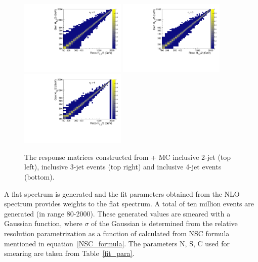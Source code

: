 \begin{figure}[!htbp]
\begin{center}
    \includegraphics[width=0.45\textwidth]{Plots_HT_2_150/Normalized_Response_Matrix_Madgraph_2_HT_2_150.pdf}%
    \includegraphics[width=0.45\textwidth]{Plots_HT_2_150/Normalized_Response_Matrix_Madgraph_3_HT_2_150.pdf}\\
    \includegraphics[width=0.45\textwidth]{Plots_HT_2_150/Normalized_Response_Matrix_Madgraph_4_HT_2_150.pdf} 
    \caption{The response matrices constructed from \MadGraphF + \PYTHIAS MC inclusive 2-jet (top left), inclusive 3-jet events (top right) and inclusive 4-jet events (bottom).}
    \label{fig:response_MC}
  \end{center}
\end{figure}

A flat \httwo spectrum is generated and the fit parameters obtained from the NLO spectrum provides weights to the flat spectrum. A total of 
ten million events are generated (in \httwo range 80-2000). These generated values are smeared with a Gaussian function, where $\sigma$ of 
the Gaussian is determined from the relative resolution parametrization as a function of \httwo calculated from NSC formula mentioned in 
equation~\ref{NSC_formula}. The parameters N, S, C used for smearing are taken from Table~\ref{fit_para}.

